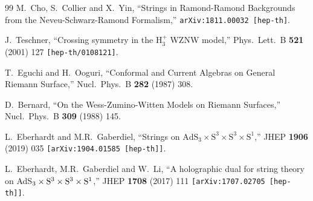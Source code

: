 \documentclass[12pt,a4paper]{article}
\begin{document}
\begin{thebibliography}{99}
  M.~Cho, S.~Collier and X.~Yin,
  ``Strings in Ramond-Ramond Backgrounds from the Neveu-Schwarz-Ramond Formalism,''
  {\tt arXiv:1811.00032 [hep-th]}.

  J.~Teschner,
  ``Crossing symmetry in the $\mathrm{H}_3^+$ WZNW model,''
  Phys.\ Lett.\ B {\bf 521} (2001) 127
  {\tt [hep-th/0108121]}.
  
T.~Eguchi and H.~Ooguri,
``Conformal and Current Algebras on General Riemann Surface,''
Nucl.\ Phys.\ B {\bf 282} (1987) 308.
  
D.~Bernard,
``On the {Wess-Zumino-Witten} Models on Riemann Surfaces,''
Nucl.\ Phys.\ B {\bf 309} (1988) 145.
  
L.~Eberhardt and M.R.~Gaberdiel,
``Strings on $\text{AdS}_3 \times \text{S}^3 \times \text{S}^3 \times \text{S}^1$,''
JHEP {\bf 1906} (2019) 035 
{\tt [arXiv:1904.01585 [hep-th]]}. 

L.~Eberhardt, M.R.~Gaberdiel and W.~Li,
``A holographic dual for string theory on AdS$_{3}\times {\rm S}^{3}\times {\rm S}^{3}\times {\rm S}^{1}$,''
JHEP {\bf 1708} (2017) 111
{\tt [arXiv:1707.02705 [hep-th]]}.
  
  
\end{thebibliography}
\end{document}
